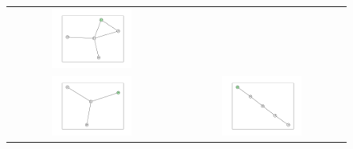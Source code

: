 \documentclass[12pt, a4paper]{extarticle}
\begin{document}
\begin{figure}
\begin{tabularx}{\textwidth}{cc}
\includegraphics[width=0.5\textwidth]{task11-graphlets/5_14-21-25-20-23.pdf} \\
\includegraphics[width=0.5\textwidth]{task11-graphlets/4_21-20-22-23.pdf} &
\includegraphics[width=0.5\textwidth]{task11-graphlets/5_14-16-13-25-23.pdf} \\
\end{tabularx}\end{figure}
\end{document}
